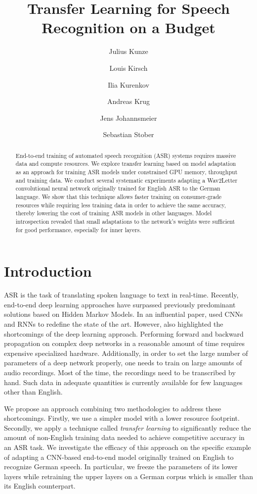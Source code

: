 \documentclass[11pt,a4paper]{article}
\title{Transfer Learning for Speech Recognition on a Budget}
\author[1]{Julius Kunze}
\author[1]{Louis Kirsch}
\author[2]{Ilia Kurenkov}
\author[2]{Andreas Krug}
\author[2]{\authorcr Jens Johannsmeier}
\author[2]{Sebastian Stober}
\affil[1]{Hasso Plattner Institute, Potsdam, Germany \authorcr
{\tt juliuskunze@gmail.com, mail@louiskirsch.com}}
\affil[2]{University of Potsdam, Potsdam, Germany \authorcr
{\tt \{kurenkov,ankrug,johannsmeier,sstober\}@uni-potsdam.de}}
\date{}
\begin{document}
\maketitle
\begin{abstract}
End-to-end training of automated speech recognition (ASR) systems requires massive data and compute resources.
We explore transfer learning based on model adaptation as an approach for training ASR models under constrained GPU memory, throughput and training data. 
We conduct several systematic experiments adapting a Wav2Letter convolutional neural network originally trained for English ASR to the German language.
We show that this technique allows faster training on consumer-grade resources while requiring less training data in order to achieve the same accuracy, thereby lowering the cost of training ASR models in other languages. 
Model introspection revealed that small adaptations to the network's weights were sufficient for good performance, especially for inner layers.
\end{abstract}
\acresetall

\sloppy

\section{Introduction}\label{sec:intro}

\ac{ASR} is the task of translating spoken language to text in real-time.
Recently, end-to-end deep learning approaches have surpassed previously predominant solutions based on Hidden Markov Models.
In an influential paper, \citet{DBLP:journals/corr/AmodeiABCCCCCCD15} used \acp{CNN} and \acp{RNN} to redefine the state of the art.
However, \citet{DBLP:journals/corr/AmodeiABCCCCCCD15} also highlighted the shortcomings of the deep learning approach.
Performing forward and backward propagation on complex deep networks in a reasonable amount of time requires expensive specialized hardware.
Additionally, in order to set the large number of parameters of a deep network properly, one needs to train on large amounts of audio recordings. 
Most of the time, the recordings need to be transcribed by hand.
Such data in adequate quantities is currently available for few languages other than English.

We propose an approach combining two methodologies to address these shortcomings.
Firstly, we use a simpler model with a lower resource footprint.
Secondly, we apply a technique called \emph{transfer learning} to significantly reduce the amount of non-English training data needed to achieve competitive accuracy in an \ac{ASR} task.
We investigate the efficacy of this approach on the specific example of adapting a CNN-based end-to-end model originally trained on English to recognize German speech.
In particular, we freeze the parameters of its lower layers while retraining the upper layers on a German corpus which is smaller than its English counterpart.
\end{document}
